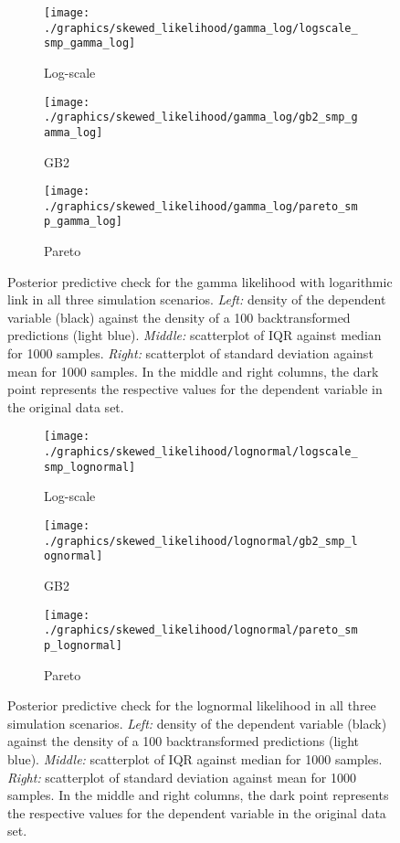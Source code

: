 \begin{figure}[t]
    \begin{subfigure}{\textwidth}
        \texttt{[image: ./graphics/skewed\_likelihood/gamma\_log/logscale\_smp\_gamma\_log]}
        \caption{Log-scale}
    \end{subfigure}
    \newline
    \begin{subfigure}{\textwidth}
        \texttt{[image: ./graphics/skewed\_likelihood/gamma\_log/gb2\_smp\_gamma\_log]}
        \caption{GB2}
    \end{subfigure}
    \newline
    \begin{subfigure}{\textwidth}
        \texttt{[image: ./graphics/skewed\_likelihood/gamma\_log/pareto\_smp\_gamma\_log]}
        \caption{Pareto}
    \end{subfigure}
    \caption[Posterior predictive check for the gamma likelihood in all three simulation scenarios.]{Posterior predictive check for the gamma likelihood with logarithmic link in all three simulation scenarios. \textit{Left:} density of the dependent variable (black) against the  density of a 100 backtransformed predictions (light blue). \textit{Middle:} scatterplot of IQR against median for 1000 samples. \textit{Right:} scatterplot of standard deviation against mean for 1000 samples. In the middle and right columns, the dark point represents the respective values for the dependent variable in the original data set.}
    \label{fig:ppc_gamma_log}
\end{figure}



\begin{figure}[t]
    \begin{subfigure}{\textwidth}
        \texttt{[image: ./graphics/skewed\_likelihood/lognormal/logscale\_smp\_lognormal]}
        \caption{Log-scale}
    \end{subfigure}
    \newline
    \begin{subfigure}{\textwidth}
        \texttt{[image: ./graphics/skewed\_likelihood/lognormal/gb2\_smp\_lognormal]}
        \caption{GB2}
    \end{subfigure}
    \newline
    \begin{subfigure}{\textwidth}
        \texttt{[image: ./graphics/skewed\_likelihood/lognormal/pareto\_smp\_lognormal]}
        \caption{Pareto}
    \end{subfigure}
    \caption[Posterior predictive check for the lognormal likelihood in all three simulation scenarios.]{Posterior predictive check for the lognormal likelihood in all three simulation scenarios. \textit{Left:} density of the dependent variable (black) against the  density of a 100 backtransformed predictions (light blue). \textit{Middle:} scatterplot of IQR against median for 1000 samples. \textit{Right:} scatterplot of standard deviation against mean for 1000 samples. In the middle and right columns, the dark point represents the respective values for the dependent variable in the original data set.}
    \label{fig:ppc_lognormal}
\end{figure}